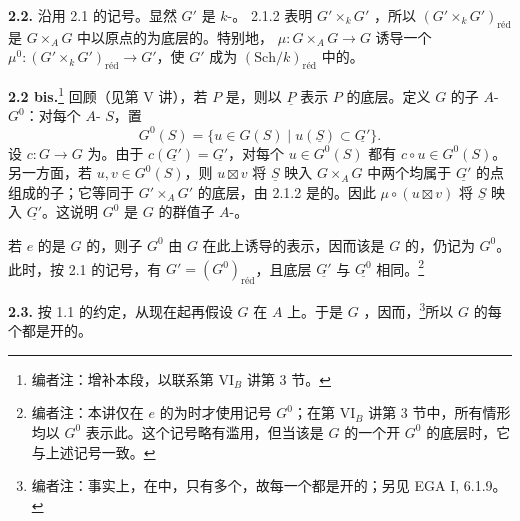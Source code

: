 \textbf{2.2.} 沿用 2.1 的记号。显然 $G'$ 是 $k$-。 2.1.2 表明 $G'\times_k G'$ ，所以 $(G'\times_k G')_{\mathrm{r\text{é}d}}$ 是 $G\times_A G$ 中以原点的为底层的。特别地， $\mu:G\times_A G\to G$ 诱导一个 $\mu^0:(G'\times_k G')_{\mathrm{r\text{é}d}}\to G'$，使 $G'$ 成为 $(\mathrm{Sch}/k)_{\mathrm{r\text{é}d}}$ 中的。

\textbf{2.2 bis.}\footnote{编者注：增补本段，以联系第 VI$_B$ 讲第 3 节。} 回顾（见第 V 讲），若 $P$ 是，则以 $\underline P$ 表示 $P$ 的底层。定义 $G$ 的子 $A$- $G^0$：对每个 $A$- $S$，置
\[
G^0(S)=\{u\in G(S)\mid u(\underline S)\subset\underline{G'}\}.
\]
设 $c:G\to G$ 为。由于 $c(\underline{G'})=\underline{G'}$，对每个 $u\in G^0(S)$ 都有 $c\circ u\in G^0(S)$。另一方面，若 $u,v\in G^0(S)$，则 $u\boxtimes v$ 将 $\underline S$ 映入 $G\times_A G$ 中两个均属于 $\underline{G'}$ 的点组成的子；它等同于 $G'\times_A G'$ 的底层，由 2.1.2 是的。因此 $\mu\circ(u\boxtimes v)$ 将 $\underline S$ 映入 $\underline{G'}$。这说明 $G^0$ 是 $G$ 的群值子 $A$-。

若 $e$ 的是 $G$ 的，则子 $G^0$ 由 $G$ 在此上诱导的表示，因而该是 $G$ 的，仍记为 $G^0$。此时，按 2.1 的记号，有 $G'=(G^0)_{\mathrm{r\text{é}d}}$，且底层 $\underline{G'}$ 与 $\underline{G^0}$ 相同。\footnote{编者注：本讲仅在 $e$ 的为时才使用记号 $G^0$；在第 VI$_B$ 讲第 3 节中，所有情形均以 $G^0$ 表示此。这个记号略有滥用，但当该是 $G$ 的一个开 $G^0$ 的底层时，它与上述记号一致。}

\textbf{2.3.} 按 1.1 的约定，从现在起再假设 $G$ 在 $A$ 上。于是 $G$ ，因而，\footnote{编者注：事实上，在中，只有多个，故每一个都是开的；另见 EGA I, 6.1.9。}所以 $G$ 的每个都是开的。

